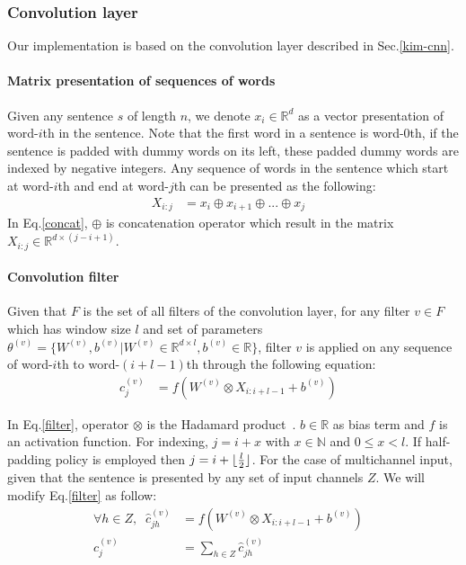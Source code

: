 \subsubsection{Convolution layer} \label{sec:conv1c}
Our implementation is based on the convolution layer described in Sec.\ref{kim-cnn}.
\paragraph{Matrix presentation of sequences of words}
Given any sentence \(s\) of length \(n\), we denote \(x_i \in \mathbb{R}^d\) as a vector presentation of word-\(i\)th in the sentence.
Note that the first word in a sentence is word-\(0\)th, if the sentence is padded with dummy words on its left, these padded dummy words are indexed by negative integers.
Any sequence of words in the sentence which start at word-\(i\)th and end at word-\(j\)th can be presented as the following:
\begin{align}
    X_{i:j} &= x_i \oplus x_{i+1} \oplus ... \oplus x_{j} &\label{concat}
\end{align}
In Eq.\eqref{concat}, \(\oplus\) is concatenation operator which result in the matrix \(X_{i:j} \in \mathbb{R}^{d \times (j-i+1)}\).

\paragraph{Convolution filter}
Given that \(F\) is the set of all filters of the convolution layer, for any filter \(v \in F\) which has window size \(l\) and set of parameters \(\theta^{(v)} = \{ W^{(v)}, b^{(v)} | W^{(v)} \in \mathbb{R}^{d \times l}, b^{(v)} \in \mathbb{R}\}\), filter \({v}\) is applied on any sequence of word-\(i\)th to word-\((i+l-1)\)th through the following equation:
\begin{align}
    c^{(v)}_j &= f(W^{(v)} \otimes X_{i:i+l-1} + b^{(v)}) &\label{filter}
\end{align}

In Eq.\eqref{filter}, operator \(\otimes\) is the Hadamard product~\cite{element-prod}.  
\(b \in \mathbb{R}\) as bias term and \(f\) is an activation function.
For indexing, \(j = i + x\) with \(x \in \mathbb{N}\) and \(0 \leq x < l\).
If half-padding policy is employed then \(j = i + \lfloor \frac{l}{2} \rfloor\).
For the case of multichannel input, given that the sentence is presented by any set of input channels \(Z\).
We will modify Eq.\eqref{filter} as follow:
\begin{align}
    \forall h \in Z, \; \; \hat{c}^{(v)}_{jh} &= f(W^{(v)} \otimes X_{i:i+l-1} + b^{(v)})& \\
    c^{(v)}_j &= \sum_{h \in Z} \hat{c}^{(v)}_{jh}&
\end{align}

